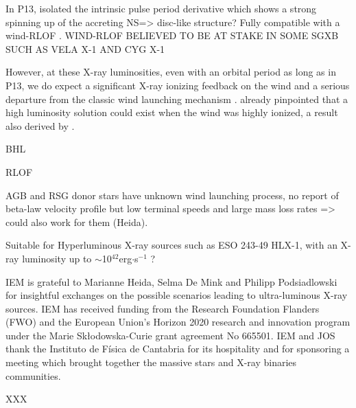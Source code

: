 \documentclass[letter]{aa}
\makeatletter
\newcommand*{\ns}{NS\@\xspace}
\makeatother
\begin{document}
In P13, \cite{Fuerst2018} isolated the intrinsic pulse period derivative which shows a strong spinning up of the accreting \ns => disc-like structure? Fully compatible with a wind-RLOF \citep{ElMellah2019}.  WIND-RLOF BELIEVED TO BE AT STAKE IN SOME SGXB SUCH AS VELA X-1 AND CYG X-1 \citep{ElMellah2019}

However, at these X-ray luminosities, even with an orbital period as long as in P13, we do expect a significant X-ray ionizing feedback on the wind and a serious departure from the classic wind launching mechanism \citep{Hatchett1977,Stevens1991}. \cite{Ho1987} already pinpointed that a high luminosity solution could exist when the wind was highly ionized, a result also derived by \cite{Karino2014}.

BHL

RLOF

AGB and RSG donor stars have unknown wind launching process, no report of beta-law velocity profile but low terminal speeds and large mass loss rates => could also work for them (Heida).

Suitable for Hyperluminous X-ray sources such as ESO 243-49 HLX-1, with an X-ray luminosity up to $\sim$10$^{42}$erg$\cdot$s$^{-1}$ \citep{Farrell2009,Webb2017}?

\begin{acknowledgements}
IEM is grateful to Marianne Heida, Selma De Mink and Philipp Podsiadlowski for insightful exchanges on the possible scenarios leading to ultra-luminous X-ray sources. IEM has received funding from the Research Foundation Flanders (FWO) and the European Union's Horizon 2020 research and innovation program under the Marie Sk\l odowska-Curie grant agreement No 665501. IEM and JOS thank the Instituto de F\'{i}sica de Cantabria for its hospitality and for sponsoring a meeting which brought together the massive stars and X-ray binaries communities.
\end{acknowledgements}

XXX

\begin{tiny}

\end{tiny}
\end{document}
